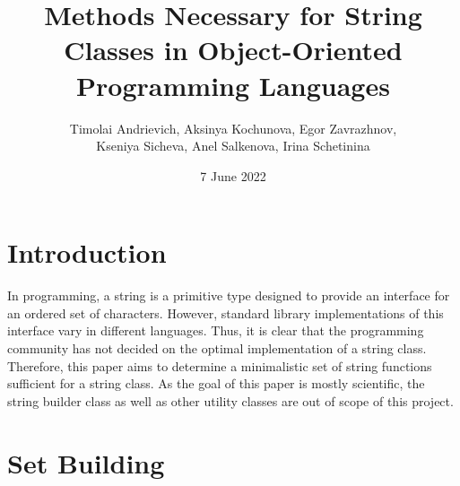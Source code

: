 \documentclass[11pt,nonacm,natbib=false]{acmart}
\title{Methods Necessary for String Classes in Object-Oriented Programming Languages}
\author{
Timolai Andrievich, 
 Aksinya Kochunova, 
 Egor Zavrazhnov, \\
 Kseniya Sicheva, 
 Anel Salkenova, 
 Irina Schetinina 
}
\date{7 June 2022}
\affil{Innopolis University}
\begin{document}
\maketitle

\section{Introduction}
In programming, a string is a primitive type designed to provide an interface for an ordered set of characters. However, standard library implementations of this interface vary in different languages. Thus, it is clear that the programming community has not decided on the optimal implementation of a string class. Therefore, this paper aims to determine a minimalistic set of string functions sufficient for a string class. As the goal of this paper is mostly scientific, the string builder class as well as other utility classes are out of scope of this project. 

\section{Set Building}
\end{document}
